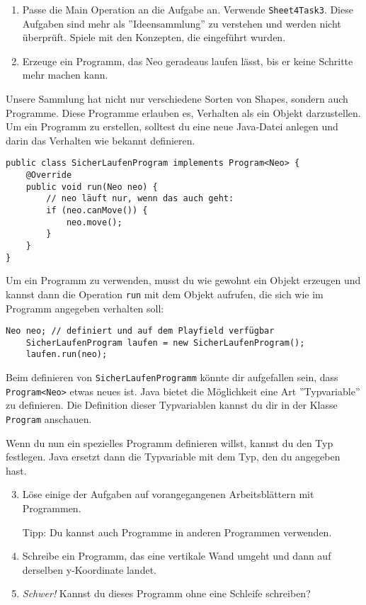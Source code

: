 
\begin{enumerate}
	\item Passe die Main Operation an die Aufgabe an.
		Verwende \lstinline{Sheet4Task3}.
		Diese Aufgaben sind mehr als ''Ideensammlung'' zu verstehen und werden nicht überprüft.
		Spiele mit den Konzepten, die eingeführt wurden.
	\item Erzeuge ein Programm, das Neo geradeaus laufen lässt, bis er keine Schritte mehr machen kann.
\end{enumerate}

\begin{Infobox}[Programme]
	Unsere Sammlung hat nicht nur verschiedene Sorten von Shapes, sondern auch Programme.
	Diese Programme erlauben es, Verhalten als ein Objekt darzustellen.
	Um ein Programm zu erstellen, solltest du eine neue Java-Datei anlegen und darin das Verhalten wie bekannt definieren.

	\begin{lstlisting}[title=SicherLaufenProgram.java, numbers=none,xleftmargin=0.5cm]
public class SicherLaufenProgram implements Program<Neo> {
	@Override
	public void run(Neo neo) {
		// neo läuft nur, wenn das auch geht:
		if (neo.canMove()) {
			neo.move();
		}
	}
}
	\end{lstlisting}

	Um ein Programm zu verwenden, musst du wie gewohnt ein Objekt erzeugen und kannst dann die Operation \lstinline{run} mit dem Objekt aufrufen, die sich wie im Programm angegeben verhalten soll:

	\begin{lstlisting}[numbers=none,xleftmargin=0.5cm]
	Neo neo; // definiert und auf dem Playfield verfügbar
	SicherLaufenProgram laufen = new SicherLaufenProgram();
	laufen.run(neo);
	\end{lstlisting}
\end{Infobox}

\begin{Infobox}
	Beim definieren von \lstinline{SicherLaufenProgramm} könnte dir aufgefallen sein, dass \mbox{\lstinline{Program<Neo>}} etwas neues ist.
	Java bietet die Möglichkeit eine Art ''Typvariable'' zu definieren.
	Die Definition dieser Typvariablen kannst du dir in der Klasse \lstinline{Program} anschauen.

	Wenn du nun ein spezielles Programm definieren willst, kannst du den Typ festlegen.
	Java ersetzt dann die Typvariable mit dem Typ, den du angegeben hast.
\end{Infobox}

\begin{enumerate}\setcounter{enumi}{2}
	\item Löse einige der Aufgaben auf vorangegangenen Arbeitsblättern mit Programmen.
	
	Tipp: Du kannst auch Programme in anderen Programmen verwenden.
	\item Schreibe ein Programm, das eine vertikale Wand umgeht und dann auf derselben y-Koordinate landet.
	\item \optional \emph{Schwer!} Kannst du dieses Programm ohne eine Schleife schreiben?
\end{enumerate}

